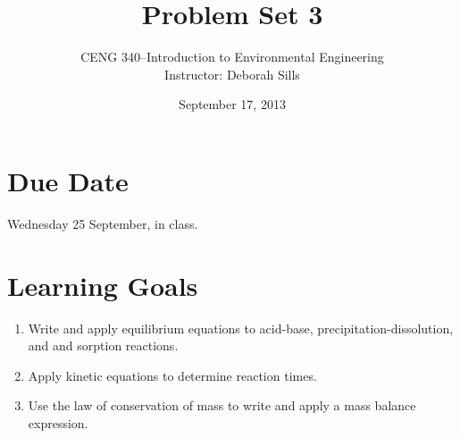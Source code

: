 \documentclass[12pt,letterpaper]{article}
\begin{document}
\setlength{\parindent}{0cm} 


\frenchspacing

\title {Problem Set 3} 
\author {CENG 340--Introduction to Environmental Engineering\\
Instructor: Deborah Sills}
\date {September 17, 2013}
\maketitle

\section *{Due Date}
Wednesday 25 September, in class.

\section *{Learning Goals}
\begin{enumerate}
\item Write and apply equilibrium equations to acid-base, precipitation-dissolution, and and sorption reactions.
\item Apply kinetic equations to determine reaction times.
\item Use the law of conservation of mass to write and apply a mass balance expression.
\end{enumerate}
\end{document}
